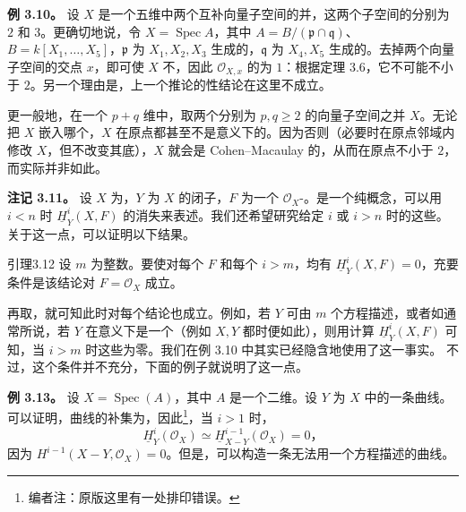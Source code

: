 \textbf{例 3.10。}
设 $X$ 是一个五维中两个互补向量子空间的并，这两个子空间的分别为 $2$ 和 $3$。更确切地说，令 $X=\operatorname{Spec}A$，其中 $A=B/(\mathfrak p\cap\mathfrak q)$、$B=k[X_1,\ldots,X_5]$，$\mathfrak p$ 为 $X_1,X_2,X_3$ 生成的，$\mathfrak q$ 为 $X_4,X_5$ 生成的。去掉两个向量子空间的交点 $x$，即可使 $X$ 不，因此 $\mathcal O_{X,x}$ 的为 $1$：根据定理 3.6，它不可能不小于 $2$。另一个理由是，上一个推论的性结论在这里不成立。

更一般地，在一个 $p+q$ 维中，取两个分别为 $p,q\ge2$ 的向量子空间之并 $X$。无论把 $X$ 嵌入哪个，$X$ 在原点都甚至不是意义下的。因为否则（必要时在原点邻域内修改 $X$，但不改变其底），$X$ 就会是 Cohen–Macaulay 的，从而在原点不小于 $2$，而实际并非如此。

\textbf{注记 3.11。}
设 $X$ 为，$Y$ 为 $X$ 的闭子，$F$ 为一个 $\mathcal O_X$-。是一个纯概念，可以用 $i<n$ 时 $\underline H_Y^i(X,F)$ 的消失来表述。我们还希望研究给定 $i$ 或 $i>n$ 时的这些。关于这一点，可以证明以下结果。
\begin{SGAresult}{引理}{3.12}
设 $m$ 为整数。要使对每个 $F$ 和每个 $i>m$，均有 $\underline H_Y^i(X,F)=0$，充要条件是该结论对 $F=\mathcal O_X$ 成立。
\end{SGAresult}
再取，就可知此时对每个结论也成立。例如，若 $Y$ 可由 $m$ 个方程描述，或者如通常所说，若 $Y$ 在意义下是一个（例如 $X,Y$ 都时便如此），则用计算 $\underline H_Y^i(X,F)$ 可知，当 $i>m$ 时这些为零。我们在例 3.10 中其实已经隐含地使用了这一事实。
不过，这个条件并不充分，下面的例子就说明了这一点。

\textbf{例 3.13。}
设 $X=\operatorname{Spec}(A)$，其中 $A$ 是一个二维。设 $Y$ 为 $X$ 中的一条曲线。可以证明，曲线的补集为，因此\footnote{编者注：原版这里有一处排印错误。}，当 $i>1$ 时，
\[
\underline H_Y^i(\mathcal O_X)\simeq
\underline H_{X-Y}^{i-1}(\mathcal O_X)=0，
\]
因为 $H^{i-1}(X-Y,\mathcal O_X)=0$。但是，可以构造一条无法用一个方程描述的曲线。

